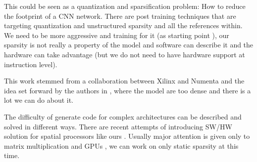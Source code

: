 \documentclass[sigconf]{acmart}
\begin{document}
This could be seen as a quantization and sparsification problem: How
to reduce the footprint of a CNN network. There are post training
techniques that are targeting quantization and unstructured sparsity
\cite{frantar2023gptq} and all the references within. We need to be
more aggressive and training for it (as starting point
\cite{abs-2102-11289}), our sparsity is not really a property of the
model and software can describe it and the hardware can take advantage
(but we do not need to have hardware support at instruction level).

This work stemmed from a collaboration between Xilinx and Numenta and
the idea set forward by the authors in \cite{ahmad2019dense}, where
the model are too dense and there is a lot we can do about
it. 


The difficulty of generate code for complex architectures can be
described and solved in different ways. There are recent attempts of
introducing SW/HW solution for spatial processors like ours
\cite{Huang2021CoSASB,Russo2023MemoryAwareDA,Cai2023InterlayerSS}.
Usually major attention is given only to matrix multiplication and
GPUs \cite{Gray2017GPUKF} \cite{li2023popsparse}, we can work on only static
sparsity at this time.
\end{document}
